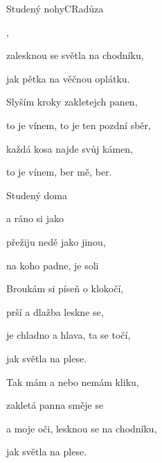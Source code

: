 \setcounter{page}{82}
\begin{song}{Studený nohy}{C}{Radůza}

\begin{SBVerse}

 ,

  

zalesknou se světla na chodníku,

jak pětka na věčnou oplátku.

\end{SBVerse}

\begin{SBVerse}

Slyším kroky zakletejch panen,

to je vínem, to je ten pozdní sběr,

každá kosa najde svůj kámen,

to je vínem, ber mě, ber.

\end{SBVerse}

\begin{SBChorus}

Studený   doma 

a ráno  si  jako 

přežiju  nedě jako  jinou,

na koho  padne,  je soli

\end{SBChorus}

\begin{SBVerse}

Broukám si píseň o klokočí,

prší a dlažba leskne se,

je chladno a hlava, ta se točí,

jak světla na plese.

\end{SBVerse}

\begin{SBChorus}

\end{SBChorus}

\begin{SBVerse}

Tak mám a nebo nemám kliku,

zakletá panna směje se

a moje oči, lesknou se na chodníku,

jak světla na plese.

\end{SBVerse}

\begin{SBChorus}

\end{SBChorus}

\end{song}

\clearpage
